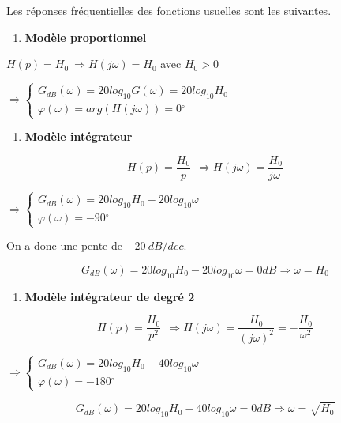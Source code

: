 Les réponses fréquentielles des fonctions usuelles sont les suivantes.

\begin{enumerate}
\def\labelenumi{\arabic{enumi}.}
\item
  \textbf{Modèle proportionnel}
\end{enumerate}

\(H(p) = H_{0}\  \Longrightarrow H(j\omega) = H_{0}\) avec \(H_{0} > 0\)

\(\Rightarrow \left\{ \begin{array}{r}
G_{dB}(\omega) = 20{log_{10}}{G(\omega)} = 20{log_{10}}H_{0} \\
\varphi(\omega) = arg(H(j\omega)) = 0{^\circ}
\end{array} \right.\ \)

\begin{enumerate}
\def\labelenumi{\arabic{enumi}.}
\setcounter{enumi}{1}
\item
  \protect\hypertarget{_Toc337686846}{}{}\textbf{Modèle intégrateur}
\end{enumerate}

\[H(p) = \frac{H_{0}}{p}\ \  \Longrightarrow H(j\omega) = \frac{H_{0}}{j\omega\ }\]

\(\Rightarrow \left\{ \begin{array}{r}
G_{dB}(\omega) = 20{log_{10}}{H_{0} - 20{log_{10}}\omega} \\
\varphi(\omega) = - 90{^\circ}
\end{array} \right.\ \)

On a donc une pente de \(- 20\ dB/dec\).

\[G_{dB}(\omega) = 20{log_{10}}H_{0} - 20{log_{10}}\omega = 0dB \Longrightarrow \omega = H_{0}\]

\begin{enumerate}
\def\labelenumi{\arabic{enumi}.}
\setcounter{enumi}{2}
\item
  \textbf{Modèle intégrateur de degré 2}
\end{enumerate}

\[H(p) = \frac{H_{0}}{p^{2}}\ \  \Longrightarrow H(j\omega) = \frac{H_{0}}{(j\omega)^{2}} = - \frac{H_{0}}{\omega^{2}}\]

\(\Rightarrow \left\{ \begin{array}{r}
G_{dB}(\omega) = 20{log_{10}}{H_{0} - 40{log_{10}}\omega} \\
\varphi(\omega) = - 180{^\circ}
\end{array} \right.\ \)

\[G_{dB}(\omega) = 20{log_{10}}H_{0} - 40{log_{10}}\omega = 0dB \Longrightarrow \omega = \sqrt{H_{0}}\]

